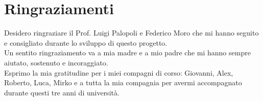 \chapter*{Ringraziamenti}
\thispagestyle{empty}

Desidero ringraziare il Prof. Luigi Palopoli e Federico Moro che mi hanno seguito e consigliato durante lo sviluppo di questo progetto.\\
Un sentito ringraziamento va a mia madre e a mio padre che mi hanno sempre aiutato, sostenuto e incoraggiato.\\
Esprimo la mia gratitudine per i miei compagni di corso: Giovanni, Alex, Roberto, Luca, Mirko e a tutta la mia compagnia per avermi accompagnato durante questi tre anni di università.

